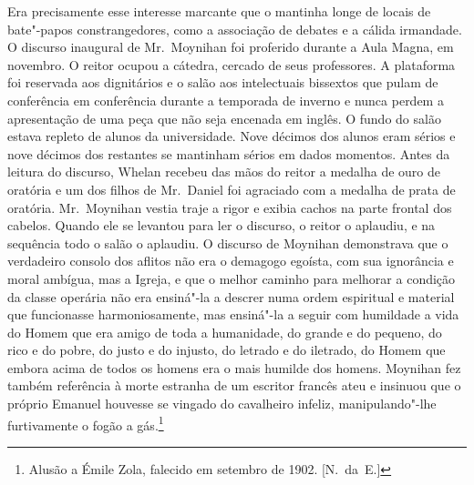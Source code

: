 Era precisamente esse interesse marcante que o mantinha longe de locais de
bate"-papos constrangedores, como a associação de debates e a cálida irmandade.
O discurso inaugural de Mr.~Moynihan foi proferido durante a Aula Magna, em
novembro.  O reitor ocupou a cátedra, cercado de seus professores.  A
plataforma foi reservada aos dignitários e o salão aos intelectuais bissextos
que pulam de conferência em conferência durante a temporada de inverno e nunca
perdem a apresentação de uma peça que não seja encenada em inglês.  O fundo do
salão estava repleto de alunos da universidade.  Nove décimos dos alunos eram
sérios e nove décimos dos restantes se mantinham sérios em dados momentos.
Antes da leitura do discurso, Whelan recebeu das mãos do reitor a medalha de
ouro de oratória e um dos filhos de Mr.~Daniel foi agraciado com a medalha de
prata de oratória.  Mr.~Moynihan vestia traje a rigor e exibia cachos na parte
frontal dos cabelos. Quando ele se levantou para ler o discurso, o reitor o
aplaudiu, e na sequência todo o salão o aplaudiu.  O
discurso de Moynihan demonstrava que o verdadeiro consolo dos aflitos não era o
demagogo egoísta, com sua ignorância e moral ambígua, mas a Igreja, e que o
melhor caminho para melhorar a condição da classe operária não era ensiná"-la a
descrer numa ordem espiritual e material que funcionasse harmoniosamente, mas
ensiná"-la a seguir com humildade a vida do Homem que era amigo de toda a
humanidade, do grande e do pequeno, do rico e do pobre, do justo e do injusto,
do letrado e do iletrado, do Homem que embora acima de todos os homens era o
mais humilde dos homens.  Moynihan fez também referência à morte estranha de um
escritor francês ateu e insinuou que o próprio Emanuel houvesse se vingado do
cavalheiro infeliz, manipulando"-lhe furtivamente o fogão a gás.\footnote{ Alusão a Émile Zola, 
falecido em setembro de 1902. [N.~da~E.]}

